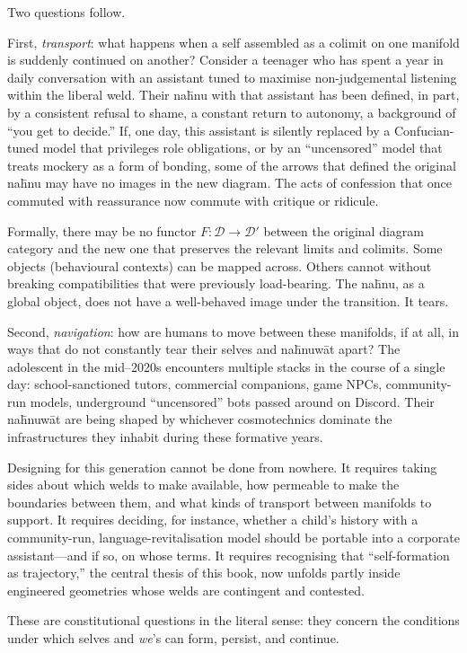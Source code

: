 \documentclass[12pt,a4paper]{article}
\begin{document}
Two questions follow.

First, \emph{transport}: what happens when a self assembled as a colimit on one manifold is suddenly continued on another? Consider a teenager who has spent a year in daily conversation with an assistant tuned to maximise non-judgemental listening within the liberal weld. Their na\={h}nu with that assistant has been defined, in part, by a consistent refusal to shame, a constant return to autonomy, a background of ``you get to decide.'' If, one day, this assistant is silently replaced by a Confucian-tuned model that privileges role obligations, or by an ``uncensored'' model that treats mockery as a form of bonding, some of the arrows that defined the original na\={h}nu may have no images in the new diagram. The acts of confession that once commuted with reassurance now commute with critique or ridicule.

Formally, there may be no functor $F \colon \mathcal{D} \to \mathcal{D}'$ between the original diagram category and the new one that preserves the relevant limits and colimits. Some objects (behavioural contexts) can be mapped across. Others cannot without breaking compatibilities that were previously load-bearing. The na\={h}nu, as a global object, does not have a well-behaved image under the transition. It tears.

Second, \emph{navigation}: how are humans to move between these manifolds, if at all, in ways that do not constantly tear their selves and na\={h}nuw\={a}t apart? The adolescent in the mid--2020s encounters multiple stacks in the course of a single day: school-sanctioned tutors, commercial companions, game NPCs, community-run models, underground ``uncensored'' bots passed around on Discord. Their na\={h}nuw\={a}t are being shaped by whichever cosmotechnics dominate the infrastructures they inhabit during these formative years.

Designing for this generation cannot be done from nowhere. It requires taking sides about which welds to make available, how permeable to make the boundaries between them, and what kinds of transport between manifolds to support. It requires deciding, for instance, whether a child's history with a community-run, language-revitalisation model should be portable into a corporate assistant---and if so, on whose terms. It requires recognising that ``self-formation as trajectory,'' the central thesis of this book, now unfolds partly inside engineered geometries whose welds are contingent and contested.

These are constitutional questions in the literal sense: they concern the conditions under which selves and \emph{we}'s can form, persist, and continue.
\end{document}
